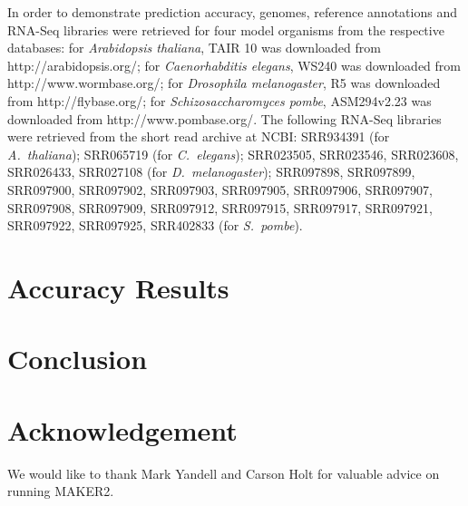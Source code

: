 \documentclass{bioinfo}
\begin{document}
\begin{methods}
In order to demonstrate prediction accuracy, genomes, reference annotations and RNA-Seq libraries were retrieved for four model organisms from the respective databases: for \textit{Arabidopsis thaliana}, TAIR 10 was downloaded from http://arabidopsis.org/; for \textit{Caenorhabditis elegans}, WS240 was downloaded from http://www.wormbase.org/; for \textit{Drosophila melanogaster}, R5 was downloaded from http://flybase.org/; for \textit{Schizosaccharomyces pombe}, ASM294v2.23 was downloaded from http://www.pombase.org/. The following RNA-Seq libraries were retrieved from the short read archive at NCBI: SRR934391 (for \textit{A.~thaliana}); SRR065719 (for \textit{C.~elegans}); SRR023505, SRR023546, SRR023608, SRR026433, SRR027108 (for \textit{D.~melanogaster}); SRR097898, SRR097899, SRR097900, SRR097902, SRR097903,
SRR097905, SRR097906, SRR097907, SRR097908, SRR097909,
SRR097912, SRR097915, SRR097917, SRR097921, SRR097922,
SRR097925, SRR402833 (for \textit{S.~pombe}).



\end{methods}


% 

\section{Accuracy Results}



%
%






\section{Conclusion}


\section*{Acknowledgement}

We would like to thank Mark Yandell and Carson Holt for valuable advice on running MAKER2.
\end{document}
